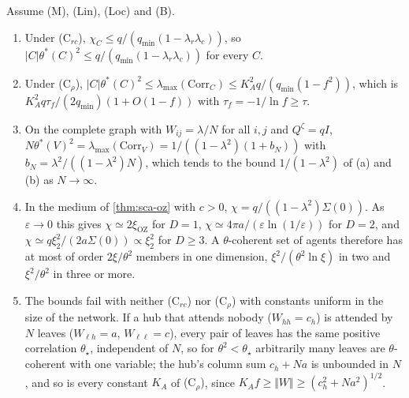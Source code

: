 \begin{corollary}\label{cor:sca-size}
Assume \textup{(M)}, \textup{(Lin)}, \textup{(Loc)} and \textup{(B)}.
\begin{enumerate}
\item[(a)] Under \textup{(C$_{rc}$)}, $\chi_C\le q/(q_{\min}(1-\lambda_r\lambda_c))$, so $|C|\theta^\ast(C)^2\le q/(q_{\min}(1-\lambda_r\lambda_c))$ for every $C$.
\item[(b)] Under \textup{(C$_\rho$)}, $|C|\theta^\ast(C)^2\le\lambda_{\max}(\mathrm{Corr}_C)\le K_A^2q/(q_{\min}(1-f^2))$, which is $K_A^2q\tau_f/(2q_{\min})(1+O(1-f))$ with $\tau_f=-1/\ln f\ge\tau$.
\item[(c)] On the complete graph with $W_{ij}=\lambda/N$ for all $i,j$ and $Q^\zeta=qI$, $N\theta^\ast(V)^2=\lambda_{\max}(\mathrm{Corr}_V)=1/((1-\lambda^2)(1+b_N))$ with $b_N=\lambda^2/((1-\lambda^2)N)$, which tends to the bound $1/(1-\lambda^2)$ of (a) and (b) as $N\to\infty$.
\item[(d)] In the medium of \cref{thm:sca-oz} with $c>0$, $\chi=q/((1-\lambda^2)\Sigma(0))$. As $\varepsilon\to0$ this gives $\chi\simeq2\xi_{\mathrm{OZ}}$ for $D=1$, $\chi\simeq4\pi a/(\varepsilon\ln(1/\varepsilon))$ for $D=2$, and $\chi\simeq q\xi_2^2/(2a\Sigma(0))\propto\xi_2^2$ for $D\ge3$. A $\theta$-coherent set of agents therefore has at most of order $2\xi/\theta^2$ members in one dimension, $\xi^2/(\theta^2\ln\xi)$ in two and $\xi^2/\theta^2$ in three or more.
\item[(e)] The bounds fail with neither \textup{(C$_{rc}$)} nor \textup{(C$_\rho$)} with constants uniform in the size of the network. If a hub that attends nobody ($W_{hh}=c_h$) is attended by $N$ leaves ($W_{\ell h}=a$, $W_{\ell\ell}=c$), every pair of leaves has the same positive correlation $\theta_\star$, independent of $N$, so for $\theta^2<\theta_\star$ arbitrarily many leaves are $\theta$-coherent with one variable; the hub's column sum $c_h+Na$ is unbounded in $N$, and so is every constant $K_A$ of \textup{(C$_\rho$)}, since $K_Af\ge\Vert W\Vert\ge(c_h^2+Na^2)^{1/2}$.
\end{enumerate}
\end{corollary}
